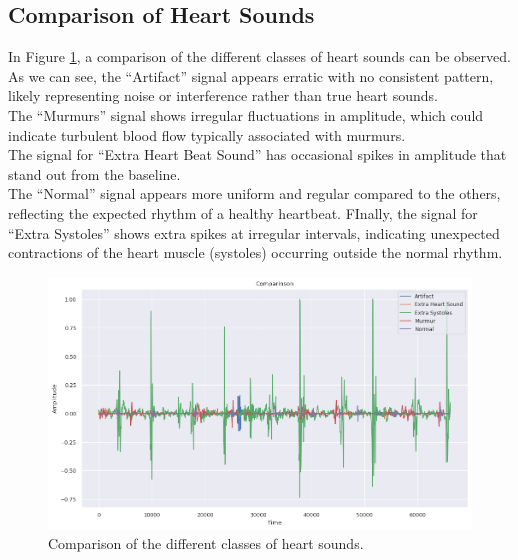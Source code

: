 \subsection{Comparison of Heart Sounds}
In Figure \ref{fig:comparison_heart_beat_audio}, a comparison of the different classes of heart sounds can be observed.\\
As we can see, the “Artifact” signal appears erratic with no consistent pattern, likely representing noise or interference rather than true heart sounds.\\
The “Murmurs” signal shows irregular fluctuations in amplitude, which could indicate turbulent blood flow typically associated with murmurs. \\
The signal for “Extra Heart Beat Sound” has occasional spikes in amplitude that stand out from the baseline.\\
The “Normal” signal appears more uniform and regular compared to the others, reflecting the expected rhythm of a healthy heartbeat.
FInally, the signal for “Extra Systoles” shows extra spikes at irregular intervals,
indicating unexpected contractions of the heart muscle (systoles) occurring outside the normal rhythm.

\begin{figure}[H]
    \centering
    \includegraphics[width=.8\columnwidth]{../images/comparison_heart_beat_audio.png}
    \caption{Comparison of the different classes of heart sounds.}
    \label{fig:comparison_heart_beat_audio}
\end{figure}
\noindent
